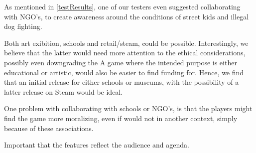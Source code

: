 As mentioned in \ref{testResults}, one of our testers even suggested collaborating with NGO's, to create awareness around the conditions of street kids and illegal dog fighting. 

Both art exibition, schools and retail/steam, could be possible. Interestingly, we believe that the latter would need more attention to the ethical considerations, possibly even downgrading the 
A game where the intended purpose is either educational or artistic, would also be easier to find funding for. 
Hence, we find that an initial release for either schools or museums, with the possibility of a latter release on Steam  would be ideal.

One problem with collaborating with schools or NGO's, is that the players might find the game more moralizing, even if would not in another context, simply because of these associations.

 Important that the features reflect the audience and agenda.